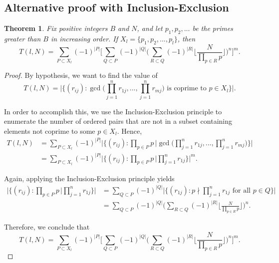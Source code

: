 \documentclass[10pt,a4paper]{article}
\newtheorem{theorem}{Theorem}[section]
\theoremstyle{definition}
\theoremstyle{remark}
\newtheorem{note}{Note}[section]
\begin{document}

\subsection{Alternative proof with Inclusion-Exclusion}

\begin{theorem}
Fix positive integers $B$ and $N$, and let $p_1, p_2, ...$ be the primes greater than $B$ in increasing order. If $X_l = \{p_1, p_2, ..., p_l\}$, then
$$T(l,N)=\sum_{P\subset X_l}{(-1)^{|P|}} \Bigg[\sum_{Q\subset P}(-1)^{|Q|} \Big(\sum_{R\subset Q}(-1)^{|R|}\Big\lfloor\frac{N}{\prod_{p\in R} p}\Big\rfloor\Big)^n\Bigg]^m.$$
\end{theorem}

\begin{proof}


By hypothesis, we want to find the value of
$$T(l,N) = \Big|\Big\{(r_{ij}) : \gcd\Big(\prod_{j=1}^nr_{1j}, ..., \prod_{j=1}^{n} r_{mj}\Big) \text{ is coprime to } p\in X_l \Big\}\Big|.$$

In order to accomplish this, we use the Inclusion-Exclusion principle to enumerate the number of ordered pairs that are not in a subset containing elements not coprime to some $p\in X_l$. Hence, 
\begin{align}
T(l, N) &= \sum_{P\subset X_l}{(-1)^{|P|}}\Bigg|\Big\{(r_{ij}):\prod_{p\in P} p \, \Big| \gcd\Big(\prod_{j=1}^nr_{1j}, ... ,\prod_{j=1}^{n} r_{mj}\Big) \Big\} \Bigg|\\ &= \sum_{P\subset X_l}{(-1)^{|P|}} \Bigg|\Big\{(r_{ij}):\prod_{p\in P} p \, \Big| \prod_{j=1}^nr_{1j}\Big\}\Bigg|^m.
\end{align}
	
\noindent Again, applying the Inclusion-Exclusion principle yields
\begin{align}
\Bigg|\Big\{(r_{ij}):\prod_{p\in P} p \, \Big|\prod_{j=1}^nr_{1j}\Big\}\Bigg| &=\sum_{Q\subset P}(-1)^{|Q|}\Big|\Big\{(r_{1j}): p \nmid \prod_{j=1}^nr_{1j} \text{ for all } p\in Q \Big\}\Big|\\
&=\sum_{Q\subset P}(-1)^{|Q|}\Biggl(\sum_{R\subset Q}(-1)^{|R|}\Biggl\lfloor\frac{N}{\prod_{p\in R} p}\Biggr\rfloor\Biggr)^n.
\end{align}
	
\noindent Therefore, we conclude that
$$T(l,N)=\sum_{P\subset X_l}{(-1)^{|P|}}\Bigg[\sum_{Q\subset P}(-1)^{|Q|}\Big(\sum_{R\subset Q}(-1)^{|R|}\Big\lfloor\frac{N}{\prod_{p\in R} p}\Big\rfloor\Big)^n\Bigg]^m.$$
\end{proof}
\end{document}
